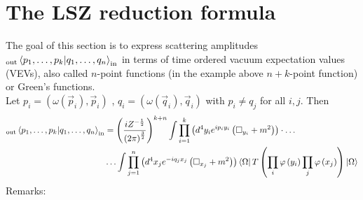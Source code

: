 \documentclass{report}
\begin{document}
\section{The LSZ reduction formula}
The goal of this section is to express scattering amplitudes $_\text{out}\bra{p_1, \ldots,p_k} \ket{q_1,\ldots,q_n}_{\text{in}} $ in terms of time ordered vacuum expectation values (VEVs), also called $n$-point functions (in the example above $n+k$-point function) or Green's functions.\\
Let $p_i = \left( \omega\left( \vec{p}_i \right) , \vec{p}_i \right) $ , $q_i = \left( \omega\left( \vec{q}_i \right) , \vec{q}_i \right) $ with $p_i \neq q_j$ for all $i,j$. Then 
\begin{align*}
  _\text{out} \bra{p_1,\ldots,p_k} \ket{q_1,\ldots,q_n}_\text{in}  &= \left( \frac{i Z^{-\frac{1}{2} } }{\left( 2\pi \right) ^{\frac{3}{2} } }  \right) ^{k+n} \int \prod_{i=1}^{k} \left( d^{4} y_i e^{ip_i y_i} \left( \square_{y_i} + m^2 \right)  \right) \cdot \ldots \\
                    & \ldots \int \prod_{j=1}^{n} \left( d^{4} x_j e^{-i q_j x_j} \left( \square_{x_j} + m^2 \right) \right) \bra{\Omega} T\left( \prod_{i}^{} \varphi\left( y_i \right) \prod_{j}^{} \varphi\left( x_j \right)    \right)    \ket{\Omega} 
\end{align*}
Remarks:
\end{document}
